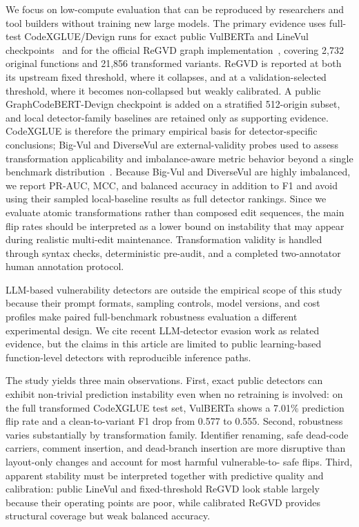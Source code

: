 \documentclass[a4paper,fleqn]{cas-dc}
\begin{document}
We focus on low-compute evaluation that can be reproduced by researchers and
tool builders without training new large models. The primary evidence uses
full-test CodeXGLUE/Devign runs for exact public VulBERTa and LineVul
checkpoints~\cite{lu2021codexglue,zhou2019devign,hanif2022vulberta,fu2022linevul}
and for the official ReGVD graph implementation~\cite{nguyen2022regvd},
covering 2,732 original functions and 21,856 transformed variants. ReGVD is
reported at both its upstream fixed threshold, where it collapses, and at a
validation-selected threshold, where it becomes non-collapsed but weakly
calibrated. A public GraphCodeBERT-Devign checkpoint is added on a stratified
512-origin subset, and local detector-family baselines are retained only as
supporting evidence. CodeXGLUE is therefore the primary empirical basis for
detector-specific conclusions; Big-Vul and DiverseVul are external-validity
probes used to assess transformation applicability and imbalance-aware metric
behavior beyond a single benchmark
distribution~\cite{fan2020bigvul,chen2023diversevul}. Because Big-Vul and
DiverseVul are highly imbalanced, we report PR-AUC, MCC, and balanced accuracy
in addition to F1 and avoid using their sampled local-baseline results as full
detector rankings. Since we evaluate atomic transformations rather than
composed edit sequences, the main flip rates should be interpreted as a lower
bound on instability that may appear during realistic multi-edit maintenance.
Transformation validity is handled through syntax checks, deterministic
pre-audit, and a completed two-annotator human annotation protocol.

LLM-based vulnerability detectors are outside the empirical scope of this
study because their prompt formats, sampling controls, model versions, and
cost profiles make paired full-benchmark robustness evaluation a different
experimental design. We cite recent LLM-detector evasion work as related
evidence, but the claims in this article are limited to public learning-based
function-level detectors with reproducible inference paths.

The study yields three main observations. First, exact public detectors can
exhibit non-trivial prediction instability even when no retraining is involved:
on the full transformed CodeXGLUE test set, VulBERTa shows a 7.01\% prediction
flip rate and a clean-to-variant F1 drop from 0.577 to 0.555. Second,
robustness varies substantially by transformation family. Identifier renaming,
safe dead-code carriers, comment insertion, and dead-branch insertion are more
disruptive than layout-only changes and account for most harmful vulnerable-to-
safe flips. Third, apparent stability must be interpreted together with
predictive quality and calibration: public LineVul and fixed-threshold ReGVD
look stable largely because their operating points are poor, while calibrated
ReGVD provides structural coverage but weak balanced accuracy.
\end{document}

